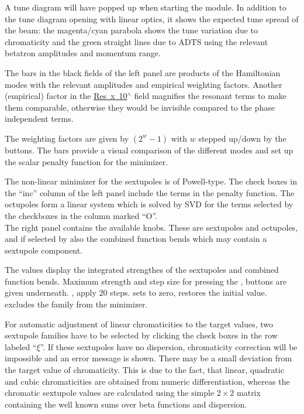 \documentclass[12pt]{article}
\newcommand\button[1]{\fbox{\small\bf #1}}
\newcommand\chkbox[1]{\fbox{\small $\circ\,$#1}}
\newcommand\field[1]{\underline{\small #1}}
\begin{document}
A tune diagram will have popped up when starting the module. In addition to the tune diagram opening with linear optics, it shows the expected tune spread of the beam: the magenta/cyan parabola shows the tune variation due to
chromaticity and the green straight lines due to ADTS using the relevant betatron amplitudes and momentum range.

The bars in the black fields of the left panel are products of the Hamiltonian modes with the relevant amplitudes and empirical weighting factors.
Another (empirical) factor in the \field{Res~x~10$^{\wedge}$} field magnifies the resonant terms to make them comparable, otherwise they would be invisible compared to the phase independent terms.

The weighting factors are given by $(2^w-1)$ with $w$ stepped up/down by
the \button{$+$} \button{$-$} buttons. The bars provide a visual comparison of the different modes and set up the scalar penalty function for the minimizer. 

The non-linear minimizer for the sextupoles is of Powell-type.
The check boxes in the ``inc'' column of the left panel include the terms in the penalty function.
The octupoles form a linear system which is solved by SVD for the terms selected by the checkboxes in the column marked ``O''.\\

The right panel contains the available knobs. These are sextupoles and octupoles, and if selected by \chkbox{incl.Comb} also the combined function bends which may contain a sextupole component.

The values display the integrated strengthes of the sextupoles and combined function bends.
Maximum strength and step size for pressing the \button{>}, \button{<} buttons are
given underneath. \button{>>}, \button{<<} apply 20 steps.
\button{off} sets to zero, \button{res} restores the initial value.
\chkbox{lock} excludes the family from the minimizer.

For automatic adjustment of linear chromaticities to the target values, two
sextupole families have to be selected by clicking the check boxes in the
row labeled ``$\xi$''. If these sextupoles have no dispersion, chromaticity
correction will be impossible and an error message is shown.
There may be a small deviation from the target value of chromaticity. This
is due to the fact, that linear, quadratic and cubic chromaticities are
obtained from numeric differentiation, whereas the chromatic sextupole
values are calculated using the simple $2\times 2$ matrix containing the well
known sums over beta functions and dispersion.
\end{document}
